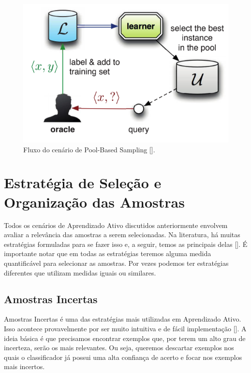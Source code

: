 \begin{figure}
  \centering
  \includegraphics[width=.5\textwidth]{figures/settles_2014_pool.png}
  \caption{Fluxo do cenário de Pool-Based Sampling [\cite{settles2014active}].}
  \label{fig:settles_2014_pool}
\end{figure}




\section{Estratégia de Seleção e Organização das Amostras}
\label{sec:query_strategy}

Todos os cenários de Aprendizado Ativo discutidos anteriormente envolvem avaliar a relevância das amostras a serem selecionadas. Na literatura, há muitas estratégias formuladas para se fazer isso e, a seguir, temos as principais delas [\cite{settles2012active}]. É importante notar que em todas as estratégias teremos alguma medida quantificável para selecionar as amostras. Por vezes podemos ter estratégias diferentes que utilizam medidas iguais ou similares.




\subsection{Amostras Incertas} %
\label{sec:amostras_incertas}


Amostras Incertas é uma das estratégias mais utilizadas em Aprendizado Ativo. Isso acontece provavelmente por ser muito intuitiva e de fácil implementação [\cite{settles2014active}]. A ideia básica é que precisamos encontrar exemplos que, por terem um alto grau de incerteza, serão os mais relevantes. Ou seja, queremos descartar exemplos nos quais o classificador já possui uma alta confiança de acerto e focar nos exemplos mais incertos.  


